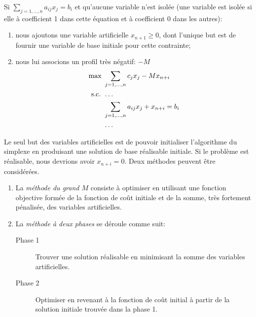 Si $\sum_{j = 1,\ldots,n} a_{ij}x_j = b_i$ et qu'aucune variable n'est isolée (une variable est isolée si elle à coefficient 1 dans cette équation et à coefficient 0 dans les autres):
\begin{enumerate}
\item
nous ajoutons une variable artificielle $x_{n+1} \geq 0$, dont l'unique but est de fournir une variable de base initiale pour cette contrainte;
\item
nous lui associons un profil très négatif: $-M$
\begin{align*}
\max\ & \sum_{j = 1,\ldots,n} c_{j}x_j - M x_{n+i} \\
\mbox{s.c. } & \ldots \\
& \sum_{j = 1,\ldots,n} a_{ij}x_j + x_{n+i} = b_i \\
& \ldots
\end{align*}
\end{enumerate}
Le seul but des variables artificielles est de pouvoir initialiser l'algorithme du simplexe en produisant une solution de base réalisable initiale.
Si le problème est réalisable, nous devrions avoir $x_{n+i} = 0$.
Deux méthodes peuvent être considérées.
\begin{enumerate}
\item
La {\sl méthode du grand $M$} consiste à optimiser en utilisant une fonction objective formée de la fonction de coût initiale et de la somme, très fortement pénalisée, des variables artificielles.
\item
La {\sl méthode à deux phases} se déroule comme suit:
\begin{description}
\item[Phase 1]
Trouver une solution réalisable en minimisant la somme des variables artificielles.
\item[Phase 2]
Optimiser en revenant à la fonction de coût initial à partir de la solution initiale trouvée dans la phase 1.
\end{description}
\end{enumerate}

